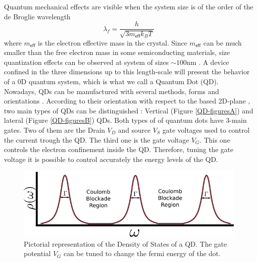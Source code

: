 Quantum mechanical effects are visible when the system size is of the order of the de Broglie wavelength \citep[(1.1)]{bimberg_quantum_1999}
\[
\lambda_{f}=\frac{h}{\sqrt{3m_{\mathsf{eff}}k_{B}T}}
\]
 where $m_{\mathsf{eff}}$ is the electron effective mass in the crystal.
Since $m_{\mathsf{eff}}$ can be much smaller than the free electron mass in some semiconducting materials, size quantization effects can be observed at system of sizes $\sim100\mbox{nm}$ \citep[2.1]{sindel_numerical_2005}. A device confined in the three dimensions up to this length-scale will present the behavior of a $0$D quantum system, which is what we call a Quantum Dot (QD).\\

Nowadays, QDs can be manufactured with several methods, forms and orientations \citep{bimberg_quantum_1999}. According to their orientation with respect to the based 2D-plane , two main types of QDs can be distinguished : Vertical (Figure \ref{QD-figuresA}) and lateral (Figure \ref{QD-figuresB}) QDs. Both types of of quantum dots have $3$-main gates. Two of them are the Drain $V_D$ and source $V_S$ gate voltages used to control the current trough the QD. The third one is the gate voltage $V_G$. This one controls the electron confinement inside the QD. Therefore, tuning the gate voltage it is possible to control accurately the energy levels of the QD. 
\begin{figure}[tb]
    \centering
    \includegraphics[scale=0.6]{IMAGES/Preliminars/specDot.png}
    \caption{Pictorial representation of the Density of States of a QD. The gate potential $V_G$ can be tuned to change the fermi energy of the dot.  \protect{} }
    \label{fig:specDots}
\end{figure}



